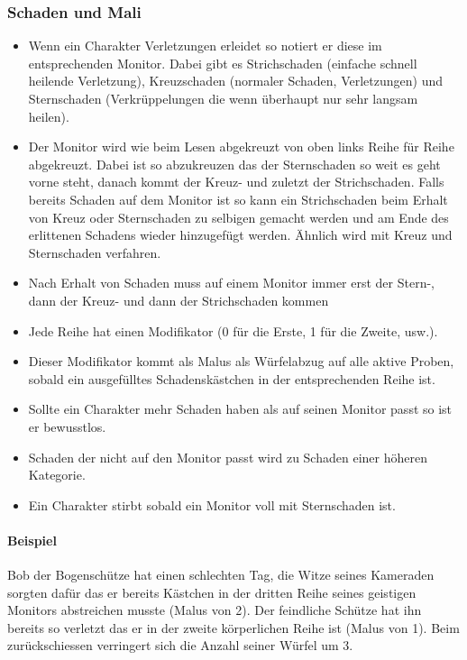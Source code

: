 \documentclass{article}
\begin{document}
\subsubsection{Schaden und Mali}

\begin{itemize}
\item Wenn ein Charakter Verletzungen erleidet so notiert er diese im entsprechenden Monitor. Dabei gibt es Strichschaden (einfache schnell heilende Verletzung), Kreuzschaden (normaler Schaden, Verletzungen) und Sternschaden (Verkrüppelungen die wenn überhaupt nur sehr langsam heilen).
\item Der Monitor wird wie beim Lesen abgekreuzt von oben links Reihe für Reihe abgekreuzt. Dabei ist so abzukreuzen das der Sternschaden so weit es geht vorne steht, danach kommt der Kreuz- und zuletzt der Strichschaden. Falls bereits Schaden auf dem Monitor ist so kann ein Strichschaden beim Erhalt von Kreuz oder Sternschaden zu selbigen gemacht werden und am Ende des erlittenen Schadens wieder hinzugefügt werden. Ähnlich wird mit Kreuz und Sternschaden verfahren.
\item Nach Erhalt von Schaden muss auf einem Monitor immer erst der Stern-, dann der Kreuz- und dann der Strichschaden kommen
\item Jede Reihe hat einen Modifikator (0 für die Erste, 1 für die Zweite, usw.).
\item Dieser Modifikator kommt als Malus als Würfelabzug auf alle aktive Proben, sobald ein ausgefülltes Schadenskästchen in der entsprechenden Reihe ist.
\item Sollte ein Charakter mehr Schaden haben als auf seinen Monitor passt so ist er bewusstlos.
\item Schaden der nicht auf den Monitor passt wird zu Schaden einer höheren Kategorie.
\item Ein Charakter stirbt sobald ein Monitor voll mit Sternschaden ist.
\end{itemize}

\paragraph{Beispiel}

Bob der Bogenschütze hat einen schlechten Tag, die Witze seines Kameraden sorgten dafür das er bereits Kästchen in
der dritten Reihe seines geistigen Monitors abstreichen musste (Malus von 2). Der feindliche Schütze hat ihn bereits
so verletzt das er in der zweite körperlichen Reihe ist (Malus von 1). Beim zurückschiessen verringert sich die
Anzahl seiner Würfel um 3.
\end{document}
